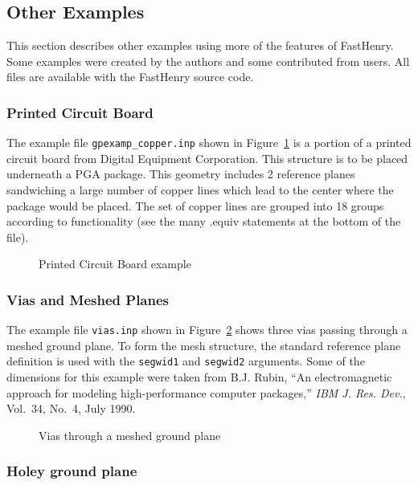 \subsection{Other Examples}

This section describes other examples using more of the features of
FastHenry.  Some examples were created by the authors and some
contributed from users.  All files are available with the FastHenry
source code.

\subsubsection{Printed Circuit Board}

The example file {\tt gpexamp\_copper.inp} shown in
Figure~\ref{gpexamp_copper} is a portion of a printed circuit board from Digital Equipment Corporation.  This structure is to
be placed underneath a PGA package.  This geometry includes 2
reference planes sandwiching a large number of copper lines which lead
to the center where the package would be placed.  The set of copper
lines are grouped into 18 groups according to functionality (see the
many .equiv statements at the bottom of the file).  

\begin{figure}
\centerline{
}
\caption{Printed Circuit Board example}
\label{gpexamp_copper}
\end{figure}

\subsubsection{Vias and Meshed Planes}

The example file {\tt vias.inp} shown in Figure~\ref{vias} shows three
vias passing through a meshed ground plane.  To form the mesh
structure, the standard reference plane definition is used with the
{\tt segwid1} and {\tt segwid2} arguments.
Some of the dimensions for this example were taken from B.J. Rubin, ``An
electromagnetic approach for modeling high-performance computer
packages,''  {\em IBM J. Res. Dev.}, Vol.~34, No.~4, July 1990.

\begin{figure}
\centerline{
}
\caption{Vias through a meshed ground plane}
\label{vias}
\end{figure}

\subsubsection{Holey ground plane}
\label{sec:holey}


